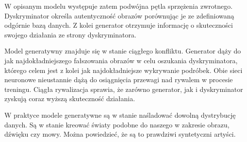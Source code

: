    W opisanym modelu występuje zatem podwójna pętla sprzężenia zwrotnego. Dyskryminator określa autentyczność obrazów porównując je ze zdefiniowaną odgórnie bazą danych. Z kolei generator otrzymuje informację o skuteczności swojego działania ze strony dyskryminatora.

   Model generatywny znajduje się w stanie ciągłego konfliktu. Generator dąży do jak najdokładniejszego fałszowania obrazów w celu oszukania dyskryminatora, którego celem jest z kolei jak najdokładniejsze wykrywanie podróbek. Obie sieci neuronowe nieustannie dążą do osiągnięcia przewagi nad rywalem w procesie treningu. Ciągła rywalizacja sprawia, że zarówno generator, jak i dyskryminator zyskują coraz wyższą skuteczność działania.

   W praktyce modele generatywne są w stanie naśladować dowolną dystrybucję danych. Są w stanie kreować światy podobne do naszego w zakresie obrazu, dźwięku czy mowy. Można powiedzieć, że są to prawdziwi syntetyczni artyści.
